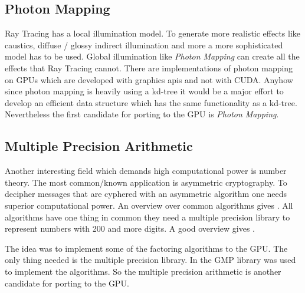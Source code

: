 \subsection{Photon Mapping} %
\label{par:photon_mapping}
Ray Tracing has a local illumination model. To generate more realistic effects
like caustics, diffuse / glossy indirect illumination and more a more
sophisticated model has to be used. Global illumination like \emph{Photon
Mapping} \citep{citeulike:635695} can create all the effects that Ray Tracing
cannot. There are implementations of photon mapping on GPUs
\citep{Purcell:2003:PMO} which are developed with graphics apis and not with
CUDA. Anyhow since photon mapping is heavily using a kd-tree it would be a major
effort to develop an efficient data structure which has the same functionality
as a kd-tree. Nevertheless the first candidate for porting to the \gls{GPU} is \emph{Photon Mapping}.

\subsection{Multiple Precision Arithmetic} %
\label{par:multiple_precision_arithmetic}
Another interesting field which demands high computational power is number
theory. The most common/known application is asymmetric cryptography. To
decipher messages that are cyphered with an asymmetric algorithm one needs
superior computational power. An overview over common algorithms gives
\citep{citeulike:3783254}. All algorithms have one thing in common they need a
multiple precision library to represent numbers with 200 and more digits. A good
overview gives \citep{citeulike:3783244}.

The idea was to implement some of the factoring algorithms to the GPU. The only
thing needed is the multiple precision library. In \citep{citeulike:3783254} the
\gls{GMP} library was used to implement the algorithms. So
the multiple precision arithmetic is another candidate for porting to the GPU.


